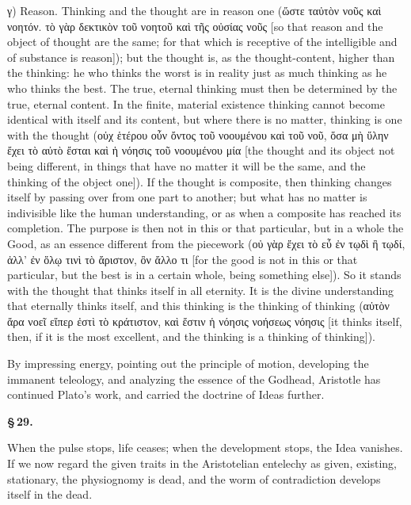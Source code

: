\documentclass[12pt]{book}
\begin{document}
γ) Reason. Thinking and the thought are in reason one (ὥστε ταὐτὸν νοῦς καὶ νοητόν. τὸ γὰρ δεκτικὸν
τοῦ νοητοῦ καὶ τῆς οὐσίας νοῦς [so that reason and the object of thought are the same; for that
which is receptive of the intelligible and of substance is reason]); but the thought is, as the
thought-content, higher than the thinking: he who thinks the worst is in reality just as much
thinking as he who thinks the best. The true, eternal thinking must then be determined by the true,
eternal content. In the finite, material existence thinking cannot become identical with itself and
its content, but where there is no matter, thinking is one with the thought (οὐχ ἑτέρου οὖν ὄντος
τοῦ νοουμένου καὶ τοῦ νοῦ, ὅσα μὴ ὕλην ἔχει τὸ αὐτὸ ἔσται καὶ ἡ νόησις τοῦ νοουμένου μία [the
thought and its object not being different, in things that have no matter it will be the same, and
the thinking of the object one]). If the thought is composite, then thinking changes itself by
passing over from one part to another; but what has no matter is indivisible like the human
understanding, or as when a composite has reached its completion. The purpose is then not in this or
that particular, but in a whole the Good, as an essence different from the piecework (οὐ γὰρ ἔχει τὸ
εὖ ἐν τῳδὶ ἢ τῳδί, ἀλλ' ἐν ὅλῳ τινὶ τὸ ἄριστον, ὂν ἄλλο τι [for the good is not in this or that
particular, but the best is in a certain whole, being something else]). So it stands
with the thought that thinks itself in all eternity. It is the divine understanding that eternally
thinks itself, and this thinking is the thinking of thinking (αὐτὸν ἄρα νοεῖ εἴπερ ἐστὶ τὸ
κράτιστον, καὶ ἔστιν ἡ νόησις νοήσεως νόησις [it thinks itself, then, if it is the most excellent,
and the thinking is a thinking of thinking]).

By impressing energy, pointing out the principle of motion, developing the immanent teleology, and
analyzing the essence of the Godhead, Aristotle has continued Plato's work, and carried the doctrine
of Ideas further.

\begin{center}{\bfseries \S\,29.}\end{center}

When the pulse stops, life ceases; when the development stops, the Idea vanishes. If we now regard
the given traits in the Aristotelian entelechy as given, existing, stationary, the physiognomy is
dead, and the worm of contradiction develops itself in the dead.
\end{document}

